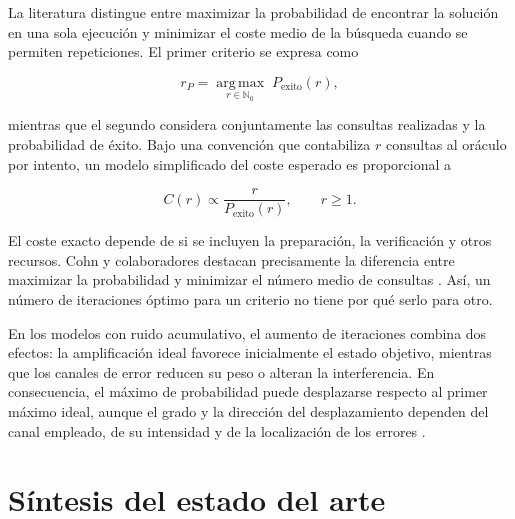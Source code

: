 \documentclass[11pt,a4paper]{article}
\begin{document}
La literatura distingue entre maximizar la probabilidad de encontrar la solución en una sola ejecución y minimizar el coste medio de la búsqueda cuando se permiten repeticiones. El primer criterio se expresa como

\begin{equation}
    r_{P}=\underset{r\in\mathbb{N}_0}{\operatorname{arg\,max}}\;P_{\mathrm{exito}}(r),
\end{equation}

mientras que el segundo considera conjuntamente las consultas realizadas y la probabilidad de éxito. Bajo una convención que contabiliza $r$ consultas al oráculo por intento, un modelo simplificado del coste esperado es proporcional a

\begin{equation}
    C(r)\propto\frac{r}{P_{\mathrm{exito}}(r)}, \qquad r\geq 1.
\end{equation}

El coste exacto depende de si se incluyen la preparación, la verificación y otros recursos. Cohn y colaboradores destacan precisamente la diferencia entre maximizar la probabilidad y minimizar el número medio de consultas \cite{cohn2016}. Así, un número de iteraciones óptimo para un criterio no tiene por qué serlo para otro.

En los modelos con ruido acumulativo, el aumento de iteraciones combina dos efectos: la amplificación ideal favorece inicialmente el estado objetivo, mientras que los canales de error reducen su peso o alteran la interferencia. En consecuencia, el máximo de probabilidad puede desplazarse respecto al primer máximo ideal, aunque el grado y la dirección del desplazamiento dependen del canal empleado, de su intensidad y de la localización de los errores \cite{cohn2016,khan2026}.

\section{Síntesis del estado del arte}
\end{document}
